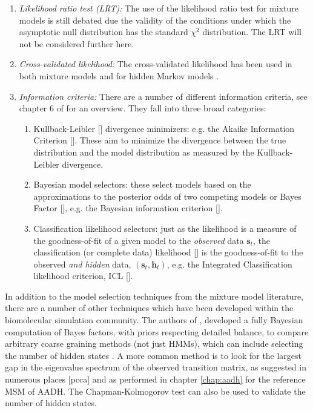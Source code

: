 \begin{enumerate}
    \item \emph{Likelihood ratio test (LRT):} The use of the likelihood ratio test for mixture models is still debated \cite{mclachlanFiniteMixtureModels2000}\cite{celeuxSelectingHiddenMarkov2008}\cite{cappe2006inference}  due the validity of the conditions under which the asymptotic null distribution has the standard $\chi^{2}$ distribution. The LRT will not be considered further here. 
    \item \emph{Cross-validated likelihood:} The cross-validated likelihood has been used in both mixture models \cite{smythModelSelectionProbabilistic2000} and for hidden Markov models \cite{celeuxSelectingHiddenMarkov2008}. 
    \item \emph{Information criteria:} There are a number of different information criteria, see chapter 6 of \cite{mclachlanFiniteMixtureModels2000} for an overview. They fall into three broad categories:
    \begin{enumerate}
        \item Kullback-Leibler [] divergence minimizers: e.g. the Akaike Information Criterion []. These aim to minimize the divergence between the true distribution and the model distribution as measured by the Kullback-Leibler divergence. 
        \item Bayesian model selectors: these select models based on the approximations to the posterior odds of two competing models or Bayes Factor [], e.g. the Bayesian information criterion [].  
        \item Classification likelihood selectors: just as the likelihood is a measure of the goodness-of-fit of a given model to the \emph{observed} data $\mathbf{s}_t$, the classification (or complete data) likelihood [] is the goodness-of-fit to the observed \emph{and hidden} data, $(\mathbf{s}_t, \mathbf{h}_t)$, e.g. the Integrated Classification likelihood criterion, ICL [].
    \end{enumerate}
\end{enumerate}
 
 In addition to the model selection techniques from the mixture model literature, there are a number of other techniques which have been developed within the biomolecular simulation community. The authors of \cite{bacalladoBayesianComparisonMarkov2009a}, developed a fully Bayesian computation of Bayes factors, with priors respecting detailed balance, to compare arbitrary coarse graining methods (not just HMMs), which can include selecting the number of hidden states \cite{bowmanQuantitativeComparisonAlternative2013}. A more common method is to look for the largest gap in the eigenvalue spectrum of the observed transition matrix, as suggested in numerous places [pcca]\cite{mcgibbonVariationalCrossvalidationSlow2015}\cite{prinzMarkovModelsMolecular2011} and as performed in chapter \ref{chap:aadh} for the reference MSM of AADH. The Chapman-Kolmogorov test can also be used to  validate the number of hidden states.
 
